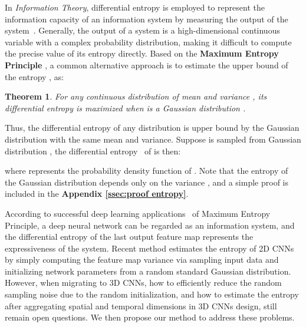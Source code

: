 \documentclass{article} \usepackage{iclr2023_conference,times}
\newtheorem{theorem}{Theorem}
\begin{document}
In \textit{Information Theory}, differential entropy is employed to represent the information capacity of an information system by measuring the output of the system~\citep{jaynes1957information,theory1,theory2,theory3,entropy}.
Generally, the output of a system is a high-dimensional continuous variable with a complex probability distribution, making it difficult to compute the precise value of its entropy directly.
Based on the \textbf{Maximum Entropy Principle} \citep{jaynes1957information}, a common alternative approach is to estimate the upper bound of the entropy \citep{Elements2012}, as:
\begin{theorem}
For any continuous distribution  of mean  and variance , its differential entropy is maximized when  is a Gaussian distribution .
\label{trm:gaussian}
\end{theorem}
Thus, the differential entropy of any distribution is upper bound by the Gaussian distribution with the same mean and variance.
Suppose  is sampled from Gaussian distribution , the differential entropy~\citep{entropy} of  is then:

where  represents the probability density function of .
Note that the entropy of the Gaussian distribution depends only on the variance , and a simple proof is included in the \textbf{Appendix \ref{ssec:proof entropy}}.

According to successful deep learning applications~\citep{saxe2019information,chan2021redunet,yu2020learning,sun2022mae,sunentropy} of Maximum Entropy Principle, a deep neural network can be regarded as an information system, and the differential entropy of the last output feature map represents the expressiveness of the system.
Recent method \citep{sun2022mae} estimates the entropy of 2D CNNs by simply computing the feature map variance via sampling input data and initializing network parameters from a random standard Gaussian distribution.
However, when migrating to 3D CNNs, 
how to efficiently reduce the random sampling noise due to the random initialization, and how to estimate the entropy after aggregating spatial and temporal dimensions in 3D CNNs design, still remain open questions. 
We then propose our method to address these problems.








 
\end{document}
